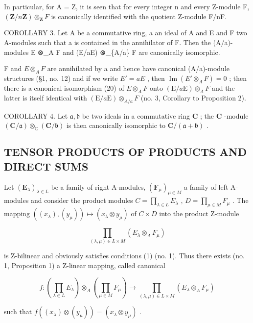 In particular, for A = Z, it is seen that for every integer n and every Z-module F, \((\mathbf{Z}/n\mathbf{Z}) \otimes_{\mathbf{Z}} F\) is canonically identified with the quotient Z-module F/nF.

COROLLARY 3. Let A be a commutative ring, a an ideal of A and E and F two A-modules such that a is contained in the annihilator of F. Then the (A/a)-modules E ⊗\_A F and (E/aE) ⊗\_\{A/a\} F are canonically isomorphic.

F and \(E \otimes_{A} F\) are annihilated by a and hence have canonical (A/a)-module structures (§1, no. 12) and if we write \(E' = aE\) , then \(\operatorname{Im}(E' \otimes_{A} F) = 0\) ; then there is a canonical isomorphism (20) of \(E \otimes_{A} F\) onto \((\mathrm{E}/a\mathrm{E}) \otimes_{A} F\) and the latter is itself identical with \((\mathrm{E}/a\mathrm{E}) \otimes_{A/a} F\) (no. 3, Corollary to Proposition 2).

COROLLARY 4. Let \(\mathfrak{a}, \mathfrak{b}\) be two ideals in a commutative ring \(\mathbf{C}\) ; the \(\mathbf{C}\) -module \((\mathbf{C} / \mathfrak{a}) \otimes_{\mathbb{C}} (\mathbf{C} / \mathfrak{b})\) is then canonically isomorphic to \(\mathbf{C}/(\mathfrak{a} + \mathfrak{b})\) .

\subsection{TENSOR PRODUCTS OF PRODUCTS AND DIRECT SUMS}

Let \((\mathbf{E}_{\lambda})_{\lambda \in L}\) be a family of right A-modules, \((\mathbf{F}_{\mu})_{\mu \in M}\) a family of left A-modules and consider the product modules \(C = \prod_{\lambda \in L} E_{\lambda}\) , \(D = \prod_{\mu \in M} F_{\mu}\) . The mapping \(((x_{\lambda}), (y_{\mu})) \mapsto (x_{\lambda} \otimes y_{\mu})\) of \(C \times D\) into the product Z-module

\[
\prod_ {(\lambda , \mu) \in L \times M} (E _ {\lambda} \otimes_ {A} F _ {\mu})
\]

is Z-bilinear and obviously satisfies conditions (1) (no. 1). Thus there exists (no. 1, Proposition 1) a Z-linear mapping, called canonical

\[
f: \left(\prod_ {\lambda \in L} E _ {\lambda}\right) \otimes_ {A} \left(\prod_ {\mu \in M} F _ {\mu}\right)\rightarrow \prod_ {(\lambda , \mu) \in L \times M} (E _ {\lambda} \otimes_ {A} F _ {\mu})\tag{22}
\]

such that \(f((x_{\lambda}) \otimes (y_{\mu})) = (x_{\lambda} \otimes y_{\mu})\) .


